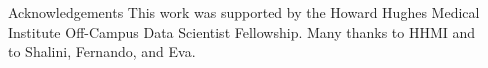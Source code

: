 \documentclass[final]{beamer}
\newlength{\sepwid}
\newlength{\onecolwid}
\begin{document}
\begin{frame}[t]
\begin{columns}[t]
\begin{column}{\onecolwid}
	  
	\begin{block}{Acknowledgements}
		This work was supported by the Howard Hughes Medical Institute Off-Campus Data Scientist Fellowship. Many thanks to HHMI and to Shalini, Fernando, and Eva. 		
	\end{block}
\end{column}
\begin{column}{\sepwid}\end{column}			%

\end{columns}
\end{frame}
\end{document}
